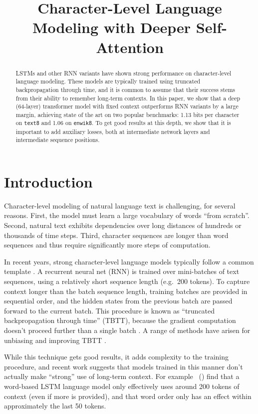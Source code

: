 \title{Character-Level Language Modeling with Deeper Self-Attention}

\begin{abstract}
LSTMs and other RNN variants have shown strong performance on character-level language modeling. These models are typically trained using truncated backpropagation through time, and it is common to assume that their success stems from their ability to remember long-term contexts. In this paper, we show that a deep (64-layer) transformer model \cite{NIPS2017_7181} with fixed context outperforms RNN variants by a large margin, achieving state of the art on two popular benchmarks: 1.13 bits per character on \texttt{text8} and 1.06 on \texttt{enwik8}.
To get good results at this depth, we show that it is important to add auxiliary losses, both at intermediate network layers and intermediate sequence positions.
\end{abstract}

\section{Introduction}

Character-level modeling of natural language text is challenging, for several reasons. First, the model must learn a large vocabulary of words ``from scratch''. Second, natural text exhibits dependencies over long distances of hundreds or thousands of time steps. Third, character sequences are longer than word sequences and thus require significantly more steps of computation.

In recent years, strong character-level language models typically follow a common template \cite{conf/interspeech/MikolovKBCK10,extensionsmikolov,sundermeyer2012lstm}. A recurrent neural net (RNN) is trained over mini-batches of text sequences, using a relatively short sequence length (e.g.~200 tokens). To capture context longer than the batch sequence length, training batches are provided in sequential order, and the hidden states from the previous batch are passed forward to the current batch. This procedure is known as ``truncated backpropagation through time'' (TBTT), because the gradient computation doesn't proceed further than a single batch \cite{werbos1990backpropagation}. A range of methods have arisen for unbiasing and improving TBTT \cite{tallec2017unbiasing,ke2017sparse}.

While this technique gets good results, it adds complexity to the training procedure, and recent work suggests that models trained in this manner don't actually make ``strong'' use of long-term context. For example \citeauthor{khandelwal2018lm}~(\citeyear{khandelwal2018lm}) find that a word-based LSTM language model only effectively uses around 200 tokens of context (even if more is provided), and that word order only has an effect within approximately the last 50 tokens.

